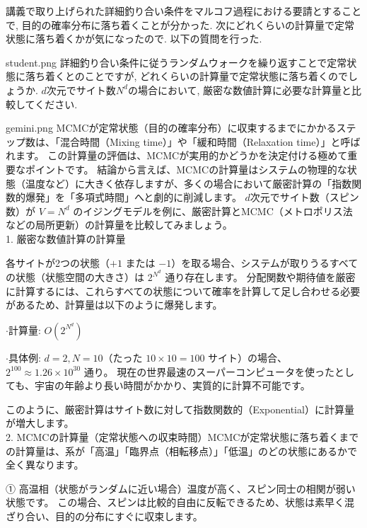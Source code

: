 \documentclass[a4paper,10.5pt]{jlreq}
\begin{document}
\newpage

\begin{explanation}[title=第2の質問]
講義で取り上げられた詳細釣り合い条件をマルコフ過程における要請とすることで, 目的の確率分布に落ち着くことが分かった. 次にどれくらいの計算量で定常状態に落ち着くかが気になったので. 以下の質問を行った.
\end{explanation}

\begin{userchat}{student.png}
詳細釣り合い条件に従うランダムウォークを繰り返すことで定常状態に落ち着くとのことですが, どれくらいの計算量で定常状態に落ち着くのでしょうか.
$d$次元でサイト数$N^d$の場合において, 厳密な数値計算に必要な計算量と比較してください.
\end{userchat}

\begin{chatbox}{gemini.png}
MCMCが定常状態（目的の確率分布）に収束するまでにかかるステップ数は、「混合時間（Mixing time）」や「緩和時間（Relaxation time）」と呼ばれます。
この計算量の評価は、MCMCが実用的かどうかを決定付ける極めて重要なポイントです。
結論から言えば、MCMCの計算量はシステムの物理的な状態（温度など）に大きく依存しますが、多くの場合において厳密計算の「指数関数的爆発」を「多項式時間」へと劇的に削減します。
$d$次元でサイト数（スピン数）が $V = N^d$ のイジングモデルを例に、厳密計算とMCMC（メトロポリス法などの局所更新）の計算量を比較してみましょう。\\

1. 厳密な数値計算の計算量

各サイトが2つの状態（$+1$ または $-1$）を取る場合、システムが取りうるすべての状態（状態空間の大きさ）は $2^{N^d}$ 通り存在します。
分配関数や期待値を厳密に計算するには、これらすべての状態について確率を計算して足し合わせる必要があるため、計算量は以下のように爆発します。

$\cdot$計算量: $O(2^{N^d})$

$\cdot$具体例: $d=2, N=10$（たった $10 \times 10 = 100$ サイト）の場合、$2^{100} \approx 1.26 \times 10^{30}$ 通り。
現在の世界最速のスーパーコンピュータを使ったとしても、宇宙の年齢より長い時間がかかり、実質的に計算不可能です。

このように、厳密計算はサイト数に対して指数関数的（Exponential）に計算量が増大します。\\

2. MCMCの計算量（定常状態への収束時間）MCMCが定常状態に落ち着くまでの計算量は、系が「高温」「臨界点（相転移点）」「低温」のどの状態にあるかで全く異なります。

① 高温相（状態がランダムに近い場合）温度が高く、スピン同士の相関が弱い状態です。
この場合、スピンは比較的自由に反転できるため、状態は素早く混ざり合い、目的の分布にすぐに収束します。


\end{chatbox}
\end{document}
